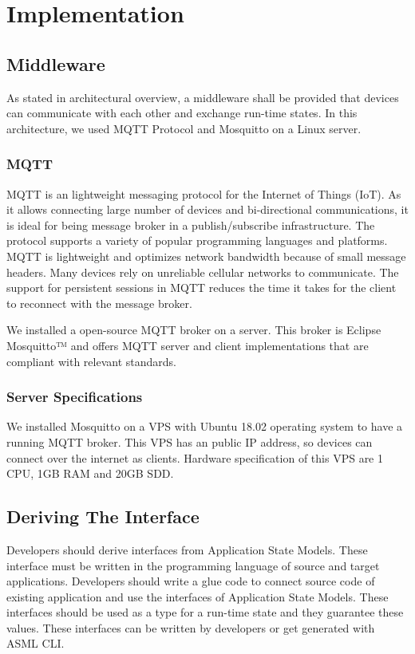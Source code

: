 \chapter{Implementation}
\label{ch:implementation}
\section{Middleware}
As stated in architectural overview, a middleware shall be provided that devices can communicate with each other and exchange run-time states. In this architecture, we used MQTT Protocol and Mosquitto on a Linux server.

\subsection{MQTT}
MQTT is an lightweight messaging protocol for the Internet of Things (IoT). As it allows connecting large number of devices and bi-directional communications, it is ideal for being message broker in a publish/subscribe infrastructure. The protocol supports a variety of popular programming languages and platforms\cite{mqtt}. MQTT is lightweight and optimizes network bandwidth because of small message headers. Many devices rely on unreliable cellular networks to communicate. The support for persistent sessions in MQTT reduces the time it takes for the client to reconnect with the message broker.

We installed a open-source MQTT broker on a server. This broker is Eclipse Mosquitto™ and offers MQTT server and client implementations that are compliant with relevant standards.
\cite{mosquitto}

\subsection{Server Specifications}
We installed Mosquitto on a VPS with Ubuntu 18.02 operating system to have a running MQTT broker. This VPS has an public IP address, so devices can connect over the internet as clients. Hardware specification of this VPS are 1 CPU, 1GB RAM and 20GB SDD. 

\section{Deriving The Interface}
Developers should derive interfaces from Application State Models. These interface must be written in the programming language of source and target applications. Developers should write a glue code to connect source code of existing application and use the interfaces of Application State Models. These interfaces should be used as a type for a run-time state and they guarantee these values. These interfaces can be written by developers or get generated with ASML CLI.


